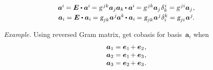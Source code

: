 \begin{otherlanguage}{russian}
\nopagebreak\vspace{-0.12em}
\begin{equation}\begin{array}{c}
\bm{a}^{\hspace{-0.05ex}i} \hspace{-0.1ex}
= \bm{E} \dotp \bm{a}^{\hspace{-0.05ex}i} \hspace{-0.15ex}
= \textsl{g}^{\hspace{0.25ex}jk} \bm{a}_j \bm{a}_k \hspace{-0.1ex} \dotp \bm{a}^{\hspace{-0.05ex}i} \hspace{-0.15ex}
= \textsl{g}^{\hspace{0.25ex}jk} \bm{a}_j \hspace{.16ex} \delta_{k}^{\hspace{.1ex}i}
= \textsl{g}^{\hspace{0.25ex}ji} \bm{a}_j \hspace{.1ex} ,
\\[.25em]
%
\bm{a}_i
= \bm{E} \dotp \bm{a}_i \hspace{-0.1ex}
= \textsl{g}_{jk} \hspace{.1ex} \bm{a}^{\hspace{.1ex}j} \hspace{-0.1ex} \bm{a}^{k} \hspace{-0.2ex} \dotp \bm{a}_i \hspace{-0.1ex}
= \textsl{g}_{jk} \hspace{.1ex} \bm{a}^{\hspace{.1ex}j} \hspace{.1ex} \delta_{i}^{k}
= \textsl{g}_{ji} \hspace{.16ex} \bm{a}^{\hspace{.1ex}j} \hspace{-0.2ex} .
\end{array}\end{equation}

\begin{tcolorbox}
\small\setlength{\abovedisplayskip}{2pt}\setlength{\belowdisplayskip}{2pt}

\emph{Example.} Using reversed Gram matrix, get cobasis for basis~$\bm{a}_i$ when
\[ \begin{array}{l}
\bm{a}_1 = \bm{e}_1 \hspace{-0.2ex} + \bm{e}_2 \hspace{.1ex},\\
\bm{a}_2 = \bm{e}_1 \hspace{-0.2ex} + \bm{e}_3 \hspace{.1ex},\\
\bm{a}_3 = \bm{e}_2 \hspace{-0.2ex} + \bm{e}_3 \hspace{.1ex}.
\end{array} \]


\end{tcolorbox}
\end{otherlanguage}
